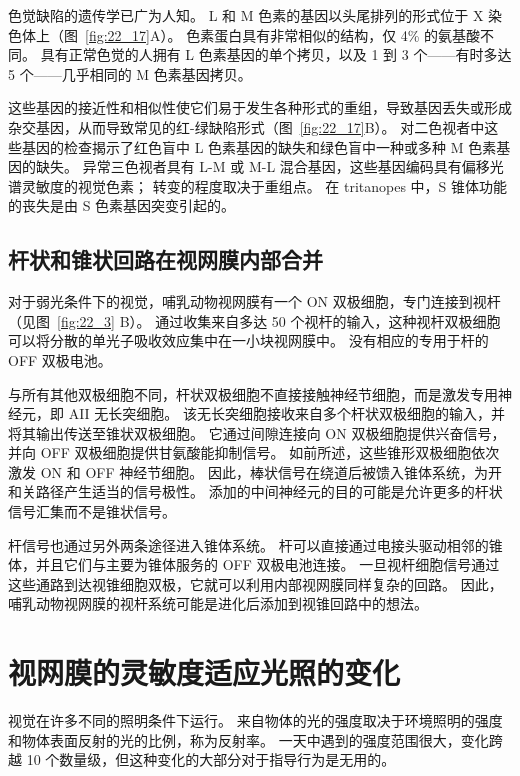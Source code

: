 色觉缺陷的遗传学已广为人知。
L 和 M 色素的基因以头尾排列的形式位于 X 染色体上（图~\ref{fig:22_17}A）。
色素蛋白具有非常相似的结构，仅 4\% 的氨基酸不同。 
具有正常色觉的人拥有 L 色素基因的单个拷贝，以及 1 到 3 个——有时多达 5 个——几乎相同的 M 色素基因拷贝。


这些基因的接近性和相似性使它们易于发生各种形式的重组，导致基因丢失或形成杂交基因，从而导致常见的红-绿缺陷形式（图~\ref{fig:22_17}B）。
对二色视者中这些基因的检查揭示了红色盲中 L 色素基因的缺失和绿色盲中一种或多种 M 色素基因的缺失。
异常三色视者具有 L-M 或 M-L 混合基因，这些基因编码具有偏移光谱灵敏度的视觉色素；
转变的程度取决于重组点。
在 tritanopes 中，S 锥体功能的丧失是由 S 色素基因突变引起的。



\subsection{杆状和锥状回路在视网膜内部合并}

对于弱光条件下的视觉，哺乳动物视网膜有一个 ON 双极细胞，专门连接到视杆（见图~\ref{fig:22_3} B）。
通过收集来自多达 50 个视杆的输入，这种视杆双极细胞可以将分散的单光子吸收效应集中在一小块视网膜中。 
没有相应的专用于杆的 OFF 双极电池。


与所有其他双极细胞不同，杆状双极细胞不直接接触神经节细胞，而是激发专用神经元，即 AII 无长突细胞。
该无长突细胞接收来自多个杆状双极细胞的输入，并将其输出传送至锥状双极细胞。
它通过间隙连接向 ON 双极细胞提供兴奋信号，并向 OFF 双极细胞提供甘氨酸能抑制信号。
如前所述，这些锥形双极细胞依次激发 ON 和 OFF 神经节细胞。
因此，棒状信号在绕道后被馈入锥体系统，为开和关路径产生适当的信号极性。
添加的中间神经元的目的可能是允许更多的杆状信号汇集而不是锥状信号。


杆信号也通过另外两条途径进入锥体系统。
杆可以直接通过电接头驱动相邻的锥体，并且它们与主要为锥体服务的 OFF 双极电池连接。
一旦视杆细胞信号通过这些通路到达视锥细胞双极，它就可以利用内部视网膜同样复杂的回路。
因此，哺乳动物视网膜的视杆系统可能是进化后添加到视锥回路中的想法。



\section{视网膜的灵敏度适应光照的变化}

视觉在许多不同的照明条件下运行。
来自物体的光的强度取决于环境照明的强度和物体表面反射的光的比例，称为反射率。
一天中遇到的强度范围很大，变化跨越 10 个数量级，但这种变化的大部分对于指导行为是无用的。


